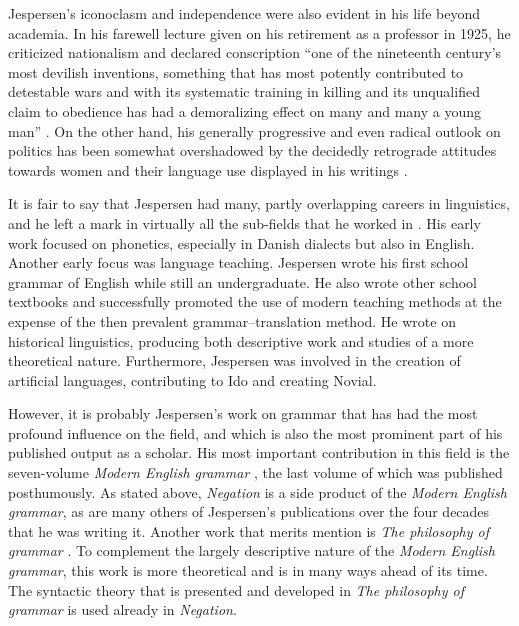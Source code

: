 \documentclass[output=chapter]{langscibook}
\begin{document}
Jespersen’s iconoclasm and independence were also evident in his life beyond academia. In his farewell lecture given on his retirement as a professor in 1925, he criticized nationalism and declared conscription ``one of the nineteenth century’s most devilish inventions, something that has most potently contributed to detestable wars and with its systematic training in killing and its unqualified claim to obedience has had a demoralizing effect on many and many a young man'' \citep[3]{Jespersen1933}. On the other hand, his generally progressive and even radical outlook on politics has been somewhat overshadowed by the decidedly retrograde attitudes towards women and their language use displayed in his writings \citep[346--347]{HovdhaugenEtAl2000}.

It is fair to say that Jespersen had many, partly overlapping careers in linguistics, and he left a mark in virtually all the sub-fields that he worked in \citep[see][]{JuulNielsen1989,Falk1992,HovdhaugenEtAl2000}. His early work focused on phonetics, especially in Danish dialects but also in English. Another early focus was language teaching. Jespersen wrote his first school grammar of English while still an undergraduate. He also wrote other school textbooks and successfully promoted the use of modern teaching methods at the expense of the then prevalent grammar--translation method. He wrote on historical linguistics, producing both descriptive work and studies of a more theoretical nature. Furthermore, Jespersen was involved in the creation of artificial languages, contributing to Ido and creating Novial.

However, it is probably Jespersen’s work on grammar that has had the most profound influence on the field, and which is also the most prominent part of his published output as a scholar. His most important contribution in this field is the seven-volume \textit{Modern English grammar} \citep{Jespersen1909}, the last volume of which was published posthumously. As stated above, \textit{Negation} is a side product of the \textit{Modern English grammar}, as are many others of Jespersen’s publications over the four decades that he was writing it. Another work that merits mention is \textit{The philosophy of grammar} \citep{Jespersen1924}. To complement the largely descriptive nature of the \textit{Modern English grammar}, this work is more theoretical and is in many ways ahead of its time. The syntactic theory that is presented and developed in \textit{The philosophy of grammar} is used already in \textit{Negation}.
\end{document}
